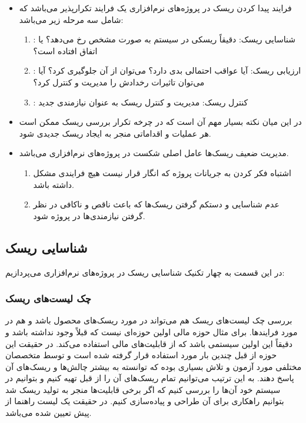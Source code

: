 \begin{itemize}
    \item فرایند پیدا کردن ریسک در پروژه‌های نرم‌افزاری یک فرایند تکرارپذیر
    می‌باشد که شامل سه مرحله‌ زیر می‌باشد: \begin{enumerate}
    \item {}: شناسایی ریسک: دقیقاً ریسکی در سیستم به صورت
    مشخص رخ می‌دهد؟ یا اتفاق افتاده است؟
    \item {}: ارزیابی ریسک: آیا عواقب احتمالی بدی دارد؟
    می‌توان از آن جلوگیری کرد؟ آیا می‌توان تاثیرات رخدادش را مدیریت و کنترل کرد؟
    \item {}: کنترل ریسک: مدیریت و کنترل ریسک به عنوان نیازمندی
    جدید
\end{enumerate}
    \item در این میان نکته بسیار مهم آن است که در چرخه تکرار بررسی ریسک ممکن است
    هر عملیات و اقداماتی منجر به ایجاد ریسک جدیدی شود.
    \item مدیریت ضعیف ریسک‌ها عامل اصلی شکست در پروژه‌های نرم‌افزاری می‌باشد.
    \begin{enumerate}
        \item اشتباه فکر کردن به جریانات پروژه که انگار قرار نیست هیچ فرایندی
        مشکل داشته باشد.
        \item عدم شناسایی و دستکم گرفتن ریسک‌ها که باعث ناقص و ناکافی در نظر
        گرفتن نیازمندی‌ها در پروژه شود.
    \end{enumerate}
\end{itemize}

\subsection{شناسایی ریسک}

در این قسمت به چهار تکنیک شناسایی ریسک در پروژه‌های نرم‌افزاری می‌پردازیم:

\subsubsection{چک لیست‌های ریسک}

بررسی چک لیست‌های ریسک هم می‌تواند در مورد ریسک‌های محصول باشد و هم در مورد
فرایند‌ها. برای مثال حوزه مالی اولین حوزه‌ای نیست که قبلاً وجود نداشته باشد و
دقیقاً این اولین سیستمی باشد که از قابلیت‌های مالی استفاده می‌کند. در حقیقت این
حوزه از قبل چندین بار مورد استفاده قرار گرفته شده است و توسط متخصصان مختلفی مورد
آزمون و تلاش بسیاری بوده که توانسته به بیشتر چالش‌ها و ریسک‌های آن پاسخ دهند. به
این ترتیب می‌توانیم تمام ریسک‌های آن را از قبل تهیه کنیم و بتوانیم در سیستم خود
آن‌ها را بررسی کنیم که اگر برخی قابلیت‌ها منجر به تولید ریسک شد بتوانیم راهکاری
برای آن طراحی و پیاده‌سازی کنیم. در حقیقت یک لیست راهنما از پیش تعیین شده
می‌باشد.

